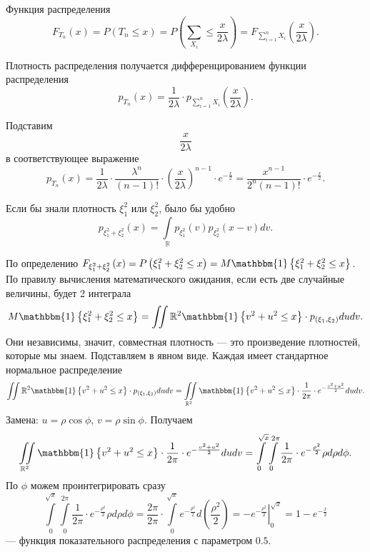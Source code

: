 Функция распределения
$$F_{T_n} \left( x \right) =
  P \left( T_n \leq x \right) =
  P \left( \sum \limits_{X_i} \leq \frac{x}{2 \lambda } \right) =
  F_{ \sum \limits_{i = 1}^n X_i} \left( \frac{x}{2 \lambda } \right).$$

Плотность распределения получается дифференцированием функции распределения
$$p_{T_n} \left( x \right) =
  \frac{1}{2 \lambda } \cdot p_{ \sum \limits_{i = 1}^n X_i} \left( \frac{x}{2 \lambda } \right).$$

Подставим
$$ \frac{x}{2 \lambda }$$
в соответствующее выражение
$$p_{T_n} \left( x \right) =
  \frac{1}{2 \lambda } \cdot \frac{ \lambda^n}{ \left( n - 1 \right)!} \cdot
  \left( \frac{x}{2 \lambda } \right)^{n - 1} \cdot e^{- \frac{x}{2}} =
  \frac{x^{n - 1}}{2^n \left( n - 1 \right)!} \cdot e^{- \frac{x}{2}}.$$

Если бы знали плотность $ \xi_1^2$ или $ \xi_2^2$, было бы удобно
$$p_{ \xi_1^2 + \xi_2^2} \left( x \right) =
  \int \limits_{ \mathbb{R}} p_{ \xi_1^2} \left( v \right) p_{ \xi_2^2} \left( x - v \right) dv.$$

По определению
$F_{ \xi_1^2 + \xi_2^2} \left( x \right) =
  P \left( \xi_1^2 + \xi_2^2 \leq x \right) =
  M \mathbbm{1} \left\{ \xi_1^2 + \xi_2^2 \leq x \right\}$.
По правилу вычисления математического ожидания, если есть две случайные величины, будет 2 интеграла
$$M \mathbbm{1} \left\{ \xi_1^2 + \xi_2^2 \leq x \right\} =
  \iint \limits{ \mathbb{R}^2}
    \mathbbm{1} \left\{ v^2 + u^2 \leq x \right\} \cdot p_{ \left( \xi_1, \xi_2 \right) }
  dudv.$$
Они независимы, значит, совместная плотность --- это произведение плотностей, которые мы знаем.
Подставляем в явном виде.
Каждая имеет стандартное нормальное распределение
$$ \iint \limits{ \mathbb{R}^2}
    \mathbbm{1} \left\{ v^2 + u^2 \leq x \right\} \cdot p_{ \left( \xi_1, \xi_2 \right) }
  dudv =
  \iint \limits_{ \mathbb{R}^2}
    \mathbbm{1} \left\{ v^2 + u^2 \leq x \right\} \cdot \frac{1}{2 \pi } \cdot
    e^{- \frac{v^2 + u^2}{2}}
  dudv.$$
Замена: $u = \rho \cos \phi, \, v = \rho \sin \phi$.
Получаем
$$ \iint \limits_{ \mathbb{R}^2}
    \mathbbm{1} \left\{ v^2 + u^2 \leq x \right\} \cdot \frac{1}{2 \pi } \cdot
    e^{- \frac{v^2 + u^2}{2}}
  dudv =
  \int \limits_0^{ \sqrt{x}}
    \int \limits_0^{2 \pi } \frac{1}{2 \pi } \cdot e^{- \frac{ \rho^2}{2}} \rho d \rho
  d \phi.$$
По $ \phi $ можем проинтегрировать сразу
$$ \int \limits_0^{ \sqrt{x}}
    \int \limits_0^{2 \pi } \frac{1}{2 \pi } \cdot e^{- \frac{ \rho^2}{2}} \rho d \rho
  d \phi =
  \frac{2 \pi }{2 \pi } \cdot
  \int \limits_0^{ \sqrt{x}} e^{- \frac{ \rho^2}{2}} d \left( \frac{ \rho^2}{2} \right) =
  \left. -e^{- \frac{ \rho^2}{2}} \right|_0^{ \sqrt{x}} =
  1 - e^{- \frac{x}{2}}$$
--- функция показательного распределения с параметром $0.5$.

